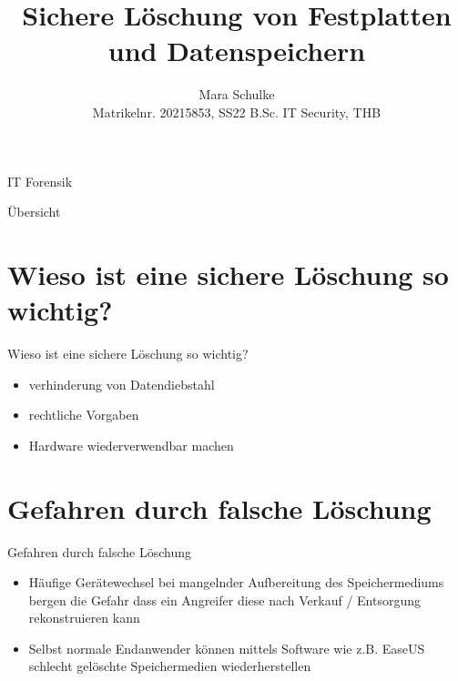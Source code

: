 \documentclass[aspectratio=169]{beamer}
\title{Sichere Löschung von Festplatten und Datenspeichern}
\author{Mara Schulke\\\tiny{Matrikelnr. 20215853, SS22 B.Sc. IT Security, THB}}
\begin{document}
\begin{frame}
	\begin{center}IT Forensik\end{center}
	\vspace{1em}
	\titlepage
\end{frame}

\begin{frame}{Übersicht}
	\tableofcontents
\end{frame}

\section{Wieso ist eine sichere Löschung so wichtig?}
\begin{frame}{Wieso ist eine sichere Löschung so wichtig?}
	\begin{itemize}
		\item verhinderung von Datendiebstahl
		\item rechtliche Vorgaben
		\item Hardware wiederverwendbar machen
	\end{itemize}
\end{frame}

\section{Gefahren durch falsche Löschung}
\begin{frame}{Gefahren durch falsche Löschung}
	\begin{itemize}
		\item Häufige Gerätewechsel bei mangelnder Aufbereitung des Speichermediums
			bergen die Gefahr dass ein Angreifer diese nach Verkauf / Entsorgung
			rekonstruieren kann
		\item Selbst normale Endanwender können mittels Software wie z.B.
			EaseUS schlecht gelöschte Speichermedien wiederherstellen 
	\end{itemize}
\end{frame}
\end{document}
